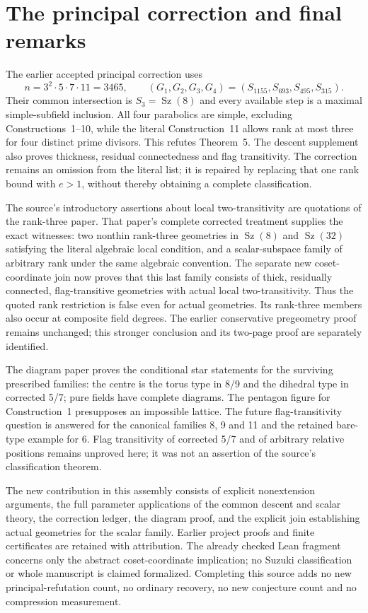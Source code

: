 \documentclass[11pt,a4paper]{article}
\newcommand{\Sz}{\operatorname{Sz}}
\begin{document}
\section{The principal correction and final remarks}
The earlier accepted principal correction uses
\[
 n=3^2\cdot5\cdot7\cdot11=3465,
 \qquad (G_1,G_2,G_3,G_4)=(S_{1155},S_{693},S_{495},S_{315}).
\]
Their common intersection is $S_3=\Sz(8)$ and every available step
is a maximal simple-subfield inclusion. All four parabolics are simple,
excluding Constructions~1--10, while the literal Construction~11 allows
rank at most three for four distinct prime divisors. This refutes
Theorem~5. The descent supplement also proves thickness, residual
connectedness and flag transitivity. The correction remains an omission
from the literal list; it is repaired by replacing that one rank bound
with $e>1$, without thereby obtaining a complete classification.

The source's introductory assertions about local two-transitivity are
quotations of the rank-three paper. That paper's complete corrected
treatment supplies the exact witnesses: two nonthin rank-three geometries
in $\Sz(8)$ and $\Sz(32)$ satisfying the literal algebraic local
condition, and a scalar-subspace family of arbitrary rank under the same
algebraic convention. The separate new coset-coordinate join now proves
that this last family consists of thick, residually connected,
flag-transitive geometries with actual local two-transitivity. Thus the
quoted rank restriction is false even for actual geometries. Its
rank-three members also occur at composite field degrees. The earlier
conservative pregeometry proof remains unchanged; this stronger
conclusion and its two-page proof are separately identified.

The diagram paper proves the conditional star statements for the surviving
prescribed families: the centre is the torus type in 8/9 and the dihedral
type in corrected 5/7; pure fields have complete diagrams. The pentagon
figure for Construction~1 presupposes an impossible lattice. The future
flag-transitivity question is answered for the canonical families 8, 9
and 11 and the retained bare-type example for 6. Flag transitivity of
corrected 5/7 and of arbitrary relative positions remains unproved here;
it was not an assertion of the source's classification theorem.

The new contribution in this assembly consists of explicit nonextension
arguments, the full parameter applications of the common descent and
scalar theory, the correction ledger, the diagram proof, and the
explicit join establishing actual geometries for the scalar family. Earlier
project proofs and finite certificates are retained with attribution.
The already checked Lean fragment concerns only the abstract coset-coordinate
implication; no Suzuki classification or whole manuscript is claimed
formalized. Completing this source adds no new principal-refutation count,
no ordinary recovery, no new conjecture count and no compression measurement.
\end{document}
